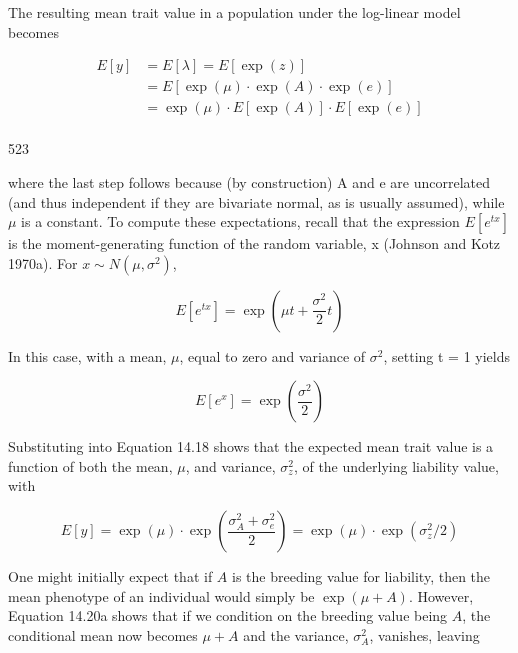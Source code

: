 \documentclass{article}
\begin{document}
The resulting mean trait value in a population under the log-linear model becomes

\begin{equation}
\begin{aligned}E[y]&=E[\lambda]=E[\exp(z)]\\&=E[\exp(\mu)\cdot\exp(A)\cdot\exp(e)]\\&=\exp(\mu)\cdot E[\exp(A)]\cdot E[\exp(e)]\\ \end{aligned}
\tag{14.18}
\label{eq:14_18}
\end{equation}

523

where the last step follows because (by construction) A and e are uncorrelated (and thus independent if they are bivariate normal, as is usually assumed), while  $ \mu $ is a constant. To compute these expectations, recall that the expression  $ E[e^{tx}] $ is the moment-generating function of the random variable, x (Johnson and Kotz 1970a). For  $ x \sim N(\mu, \sigma^{2}) $,

\begin{equation}
E\left[e^{tx}\right]=\exp\left(\mu t+\frac{\sigma^{2}}{2}t\right)
\tag{14.19a}
\label{eq:14_19a}
\end{equation}

In this case, with a mean,  $ \mu $, equal to zero and variance of  $ \sigma^{2} $, setting t = 1 yields

\begin{equation}
E\left[e^{x}\right]=\exp\left(\frac{\sigma^{2}}{2}\right)
\tag{14.19b}
\label{eq:14_19b}
\end{equation}

Substituting into Equation 14.18 shows that the expected mean trait value is a function of both the mean,  $ \mu $, and variance,  $ \sigma_{z}^{2} $, of the underlying liability value, with

\begin{equation}
E[y]=\exp(\mu)\cdot\exp\left(\frac{\sigma_{A}^{2}+\sigma_{e}^{2}}{2}\right)=\exp(\mu)\cdot\exp(\sigma_{z}^{2}/2)
\tag{14.20a}
\label{eq:14_20a}
\end{equation}

One might initially expect that if $A$ is the breeding value for liability, then the mean phenotype of an individual would simply be $\exp(\mu + A)$. However, Equation 14.20a shows that if we condition on the breeding value being $A$, the conditional mean now becomes $\mu + A$ and the variance, $\sigma_A^2$, vanishes, leaving
\end{document}
